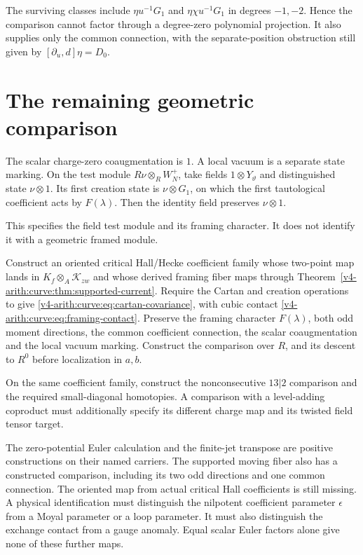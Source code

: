 The surviving classes include
$\eta u^{-1}G_1$ and $\eta\chi u^{-1}G_1$ in degrees
$-1,-2$. Hence the comparison cannot factor through
a degree-zero polynomial projection.
It also supplies only the common connection, with the
separate-position obstruction still given by
$[\partial_u,d]\eta=D_0$.

\section{The remaining geometric comparison}
\label{v4-arith:curve:sec:comparison}

The scalar charge-zero coaugmentation is $1$.
A local vacuum is a separate state marking. On the
test module $R\nu\otimes_R W_N^+$, take fields
$1\otimes Y_\vartheta$ and distinguished state
$\nu\otimes1$. Its first creation state is
$\nu\otimes G_1$, on which the first tautological
coefficient acts by $F(\lambda)$.
Then the identity field preserves $\nu\otimes1$.

This specifies the field test module and its framing
character. It does not identify it with a geometric
framed module.

\begin{problem}\label{v4-arith:curve:prob:critical}
Construct an oriented critical Hall/Hecke coefficient
family whose two-point map lands in
$K_f\otimes_A\mathcal K_{zw}$ and whose derived
framing fiber maps through
Theorem~\ref{v4-arith:curve:thm:supported-current}.
Require the Cartan and creation operations to give
\eqref{v4-arith:curve:eq:cartan-covariance}, with cubic
contact \eqref{v4-arith:curve:eq:framing-contact}.
Preserve the framing character $F(\lambda)$, both odd
moment directions, the common coefficient connection,
the scalar coaugmentation and the local vacuum marking.
Construct the comparison over $R$, and its descent to
$R^0$ before localization in $a,b$.

On the same coefficient family, construct the
nonconsecutive $13|2$ comparison and the required
small-diagonal homotopies. A comparison with a
level-adding coproduct must additionally specify its
different charge map and its twisted field tensor target.
\end{problem}

The zero-potential Euler calculation and the finite-jet
transpose are positive constructions on their named
carriers. The supported moving fiber also has a
constructed comparison, including its two odd directions
and one common connection. The oriented map from actual
critical Hall coefficients is still missing.
A physical identification must distinguish the nilpotent
coefficient parameter $\epsilon$ from a Moyal parameter
or a loop parameter.
It must also distinguish the exchange contact from a
gauge anomaly. Equal scalar
Euler factors alone give none of these further maps.
